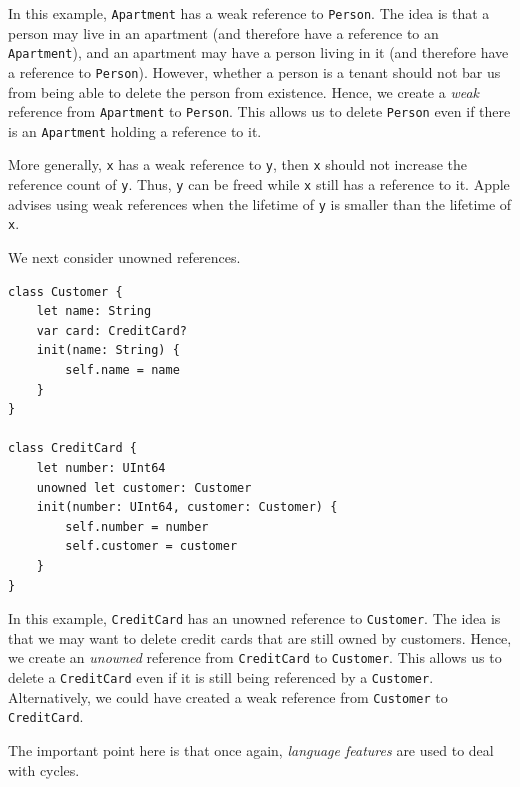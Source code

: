 In this example, \texttt{Apartment} has a weak reference to \texttt{Person}. The idea is that a person may live in an apartment (and therefore have a reference to an \texttt{Apartment}), and an apartment may have a person living in it (and therefore have a reference to \texttt{Person}). However, whether a person is a tenant should not bar us from being able to delete the person from existence. Hence, we create a \textit{weak} reference from \texttt{Apartment} to \texttt{Person}. This allows us to delete \texttt{Person} even if there is an \texttt{Apartment} holding a reference to it.

More generally, \texttt{x} has a weak reference to \texttt{y}, then \texttt{x} should not increase the reference count of \texttt{y}. Thus, \texttt{y} can be freed while \texttt{x} still has a reference to it. Apple advises using weak references when the lifetime of \texttt{y} is smaller than the lifetime of \texttt{x}.

We next consider unowned references.

\begin{code}
\label{code:Swift-unowned-ref}
\begin{verbatim}
class Customer {
    let name: String
    var card: CreditCard?
    init(name: String) {
        self.name = name
    }
}

class CreditCard {
    let number: UInt64
    unowned let customer: Customer
    init(number: UInt64, customer: Customer) {
        self.number = number
        self.customer = customer
    }
}
\end{verbatim}
\end{code}

In this example, \texttt{CreditCard} has an unowned reference to \texttt{Customer}. The idea is that we may want to delete credit cards that are still owned by customers. Hence, we create an \textit{unowned} reference from \texttt{CreditCard} to \texttt{Customer}. This allows us to delete a \texttt{CreditCard} even if it is still being referenced by a \texttt{Customer}. Alternatively, we could have created a weak reference from \texttt{Customer} to \texttt{CreditCard}.

The important point here is that once again, \textit{language features} are used to deal with cycles.

